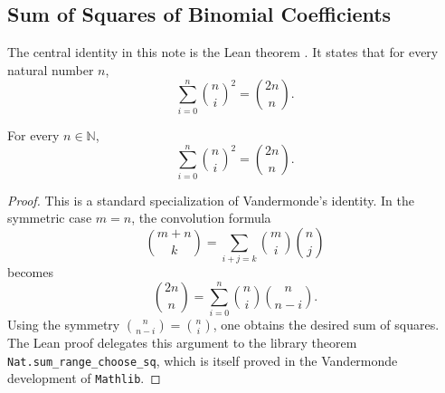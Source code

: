 
\subsection{Sum of Squares of Binomial Coefficients}

The central identity in this note is the Lean theorem
. It
states that for every natural number $n$,
\[
  \sum_{i=0}^{n} \binom{n}{i}^{2} = \binom{2n}{n}.
\]

\begin{theorem}
For every $n \in \mathbb{N}$,
\[
  \sum_{i=0}^{n} \binom{n}{i}^{2} = \binom{2n}{n}.
\]
\end{theorem}

\begin{proof}
This is a standard specialization of Vandermonde's identity. In the symmetric
case $m=n$, the convolution formula
\[
  \binom{m+n}{k}
  =
  \sum_{i+j=k} \binom{m}{i}\binom{n}{j}
\]
becomes
\[
  \binom{2n}{n}
  =
  \sum_{i=0}^{n} \binom{n}{i}\binom{n}{n-i}.
\]
Using the symmetry $\binom{n}{n-i}=\binom{n}{i}$, one obtains the desired sum
of squares. The Lean proof delegates this argument to the library theorem
\texttt{Nat.sum\_range\_choose\_sq}, which is itself proved in the Vandermonde
development of \texttt{Mathlib}.
\end{proof}
